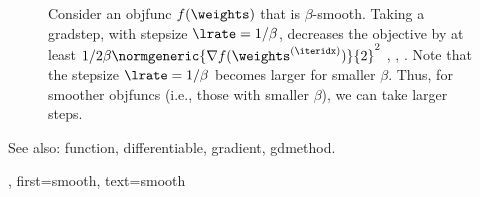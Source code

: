 {{\begin{figure}[H]
\begin{center}
	    	\end{center}
	    	\caption{Consider an \gls{objfunc} $f(\weights)$ that is $\beta$-smooth. 
	    		Taking a \gls{gradstep}, with \gls{stepsize} $\lrate = 1/\beta$, decreases the 
	    		objective by at least ${1}/{2\beta}\normgeneric{\nabla f(\weights^{(\iteridx)})}{2}^{2}$ \cite{nesterov04}, \cite{CvxBubeck2015}, \cite{CvxAlgBertsekas}. 
	    		Note that the \gls{stepsize} $\lrate = 1/\beta$ becomes larger for smaller $\beta$. Thus, 
	    		for smoother \glspl{objfunc} (i.e., those with smaller $\beta$), 
				we can take larger steps. \label{fig_gd_smooth_dict}}
	    	\end{figure}
		See also: \gls{function}, \gls{differentiable}, \gls{gradient},  \gls{gdmethod}.},
	first={smooth},
	text={smooth}
}

